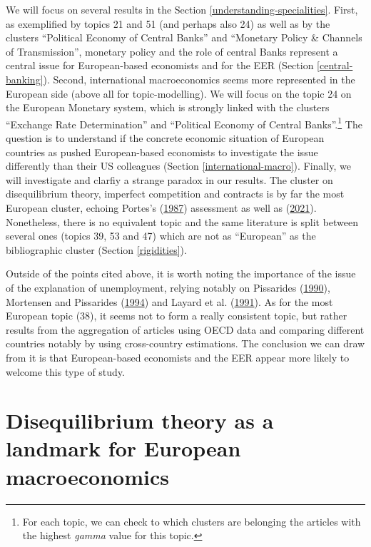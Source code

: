 \documentclass[]{elsarticle} %
\begin{document}
We will focus on several results in the Section
\ref{understanding-specialities}. First, as exemplified by topics 21 and
51 (and perhaps also 24) as well as by the clusters ``Political Economy
of Central Banks'' and ``Monetary Policy \& Channels of Transmission'',
monetary policy and the role of central Banks represent a central issue
for European-based economists and for the EER (Section
\ref{central-banking}). Second, international macroeconomics seems more
represented in the European side (above all for topic-modelling). We
will focus on the topic 24 on the European Monetary system, which is
strongly linked with the clusters ``Exchange Rate Determination'' and
``Political Economy of Central Banks''.\footnote{For each topic, we can
  check to which clusters are belonging the articles with the highest
  \emph{gamma} value for this topic.} The question is to understand if
the concrete economic situation of European countries as pushed
European-based economists to investigate the issue differently than
their US colleagues (Section \ref{international-macro}). Finally, we
will investigate and clarfiy a strange paradox in our results. The
cluster on disequilibrium theory, imperfect competition and contracts is
by far the most European cluster, echoing Portes's
(\protect\hyperlink{ref-portes1987}{1987}) assessment as well as
(\protect\hyperlink{ref-goutsmedt2021}{2021}). Nonetheless, there is no
equivalent topic and the same literature is split between several ones
(topics 39, 53 and 47) which are not as ``European'' as the
bibliographic cluster (Section \ref{rigidities}).

Outside of the points cited above, it is worth noting the importance of
the issue of the explanation of unemployment, relying notably on
Pissarides (\protect\hyperlink{ref-pissarides1990}{1990}), Mortensen and
Pissarides (\protect\hyperlink{ref-mortensen1994}{1994}) and Layard et
al. (\protect\hyperlink{ref-layard1991a}{1991}). As for the most
European topic (38), it seems not to form a really consistent topic, but
rather results from the aggregation of articles using OECD data and
comparing different countries notably by using cross-country
estimations. The conclusion we can draw from it is that European-based
economists and the EER appear more likely to welcome this type of study.

\hypertarget{disequilibrium}{%
\section{Disequilibrium theory as a landmark for European
macroeconomics}\label{disequilibrium}}
\end{document}
